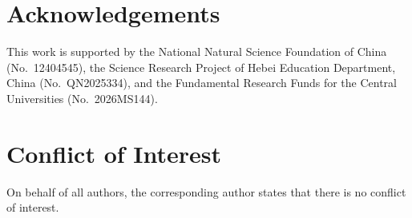 \documentclass[twocolumn,iicol,pdflatex,sn-mathphys-num]{sn-jnl}%
\begin{document}
\section{Acknowledgements}

This work is supported by the National Natural Science Foundation of China (No.~12404545), the Science Research Project of Hebei Education Department, China (No.~QN2025334), and the Fundamental Research Funds for the Central Universities (No.~2026MS144).

\section{Conflict of Interest}
On behalf of all authors, the corresponding author states that there is no conflict of interest.


\end{document}
